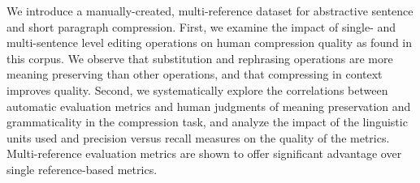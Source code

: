 We introduce a manually-created, multi-reference dataset for abstractive sentence and short paragraph compression. First, we examine the impact of single- and multi-sentence level editing operations on human compression quality as found in this corpus. We observe that substitution and rephrasing operations are more meaning preserving than other operations, and that compressing in context improves quality. Second, we systematically explore the correlations between automatic evaluation metrics and human judgments of meaning preservation and grammaticality in the compression task, and analyze the impact of the linguistic units used and precision versus recall measures on the quality of the metrics. Multi-reference evaluation metrics are shown to offer significant advantage over single reference-based metrics.
